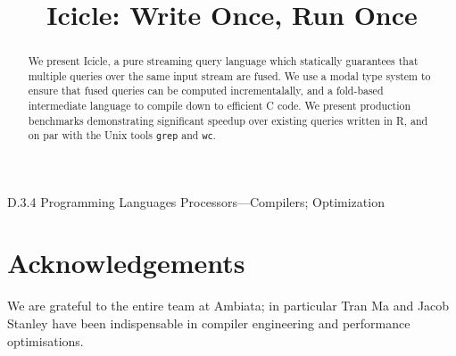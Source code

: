 \documentclass{sigplanconf}
\begin{document}
\toappear{}

\title{Icicle: Write Once, Run Once}


\maketitle
\makeatactive

\begin{abstract}
We present Icicle, a pure streaming query language which statically guarantees that multiple queries over the same input stream are fused. We use a modal type system to ensure that fused queries can be computed incrementalally, and a fold-based intermediate language to compile down to efficient C code. We present production benchmarks demonstrating significant speedup over existing queries written in R, and on par with the Unix tools \texttt{grep} and \texttt{wc}.

\end{abstract}

\category
	{D.3.4}
	{Programming Languages}
	{Processors---Compilers; Optimization}









\section*{Acknowledgements}
We are grateful to the entire team at Ambiata; in particular Tran Ma and Jacob Stanley have been indispensable in compiler engineering and performance optimisations.



\end{document}
